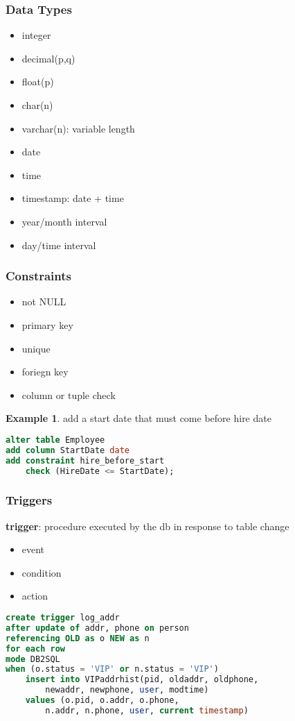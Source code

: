 \documentclass[]{article}
\theoremstyle{definition}
\newtheorem{ex}{Example}[section]
\begin{document}
		\subsubsection{Data Types}
			\begin{multicols}{2}
				\begin{itemize}
					\item integer
					\item decimal(p,q)
					\item float(p)
					\item char(n)
					\item varchar(n): variable length
					\item date
					\item time
					\item timestamp: date + time
					\item year/month interval
					\item day/time interval
				\end{itemize}
			\end{multicols}
		\subsubsection{Constraints}
			\begin{itemize}
				\item not NULL
				\item primary key
				\item unique
				\item foriegn key
				\item column or tuple check
			\end{itemize}
			\begin{ex}
				add a start date that must come before hire date
				\begin{lstlisting}[language=SQL]
alter table Employee
add column StartDate date
add constraint hire_before_start
	check (HireDate <= StartDate);
				\end{lstlisting}
			\end{ex}
		\subsubsection{Triggers}
			\textbf{trigger}: procedure executed by the db in response to table change
			\begin{itemize}
				\item event
				\item condition
				\item action
			\end{itemize}
			\begin{lstlisting}[language=SQL]
create trigger log_addr
after update of addr, phone on person
referencing OLD as o NEW as n
for each row 
mode DB2SQL
when (o.status = 'VIP' or n.status = 'VIP')
	insert into VIPaddrhist(pid, oldaddr, oldphone,
		newaddr, newphone, user, modtime)
	values (o.pid, o.addr, o.phone,
		n.addr, n.phone, user, current timestamp)
			\end{lstlisting}
\end{document}

